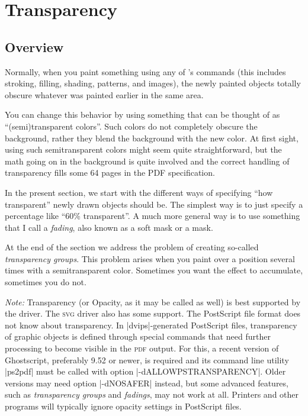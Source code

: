 %
%
%


\section{Transparency}
\label{section-tikz-transparency}

\subsection{Overview}

Normally, when you paint something using any of \tikzname's commands (this
includes stroking, filling, shading, patterns, and images), the newly painted
objects totally obscure whatever was painted earlier in the same area.

You can change this behavior by using something that can be thought of as
``(semi)transparent colors''. Such colors do not completely obscure the
background, rather they blend the background with the new color. At first
sight, using such semitransparent colors might seem quite straightforward, but
the math going on in the background is quite involved and the correct handling
of transparency fills some 64 pages in the PDF specification.

In the present section, we start with the different ways of specifying ``how
transparent'' newly drawn objects should be. The simplest way is to just
specify a percentage like ``60\% transparent''. A much more general way is to
use something that I call a \emph{fading}, also known as a soft mask or a mask.

At the end of the section we address the problem of creating so-called
\emph{transparency groups}. This problem arises when you paint over a position
several times with a semitransparent color. Sometimes you want the effect to
accumulate, sometimes you do not.

\emph{Note:} Transparency (or Opacity, as it may be called as well) is best
supported by the  driver. The \textsc{svg} driver also has some
support. The PostScript file format does not know about transparency. In
|dvips|-generated PostScript files, transparency of graphic objects is defined
through special commands that need further processing to become visible in the
\textsc{pdf} output. For this, a recent version of Ghostscript, preferably 9.52
or newer, is required and its command line utility |ps2pdf| must be called with
option |-dALLOWPSTRANSPARENCY|. Older versions may need option |-dNOSAFER|
instead, but some advanced features, such as \emph{transparency groups} and
\emph{fadings}, may not work at all. Printers and other programs will typically
ignore opacity settings in PostScript files.


